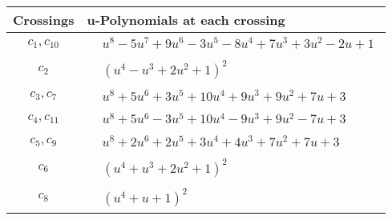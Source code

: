 \documentclass[1p]{elsarticle_modified}
\theoremstyle{definition}
\begin{document}
\begin{tabular}{m{50pt}|m{274pt}}
Crossings & \hspace{64pt}u-Polynomials at each crossing \\
\hline $$\begin{aligned}c_{1},c_{10}\end{aligned}$$&$\begin{aligned}
&u^8-5 u^7+9 u^6-3 u^5-8 u^4+7 u^3+3 u^2-2 u+1
\end{aligned}$\\
\hline $$\begin{aligned}c_{2}\end{aligned}$$&$\begin{aligned}
&(u^4- u^3+2 u^2+1)^2
\end{aligned}$\\
\hline $$\begin{aligned}c_{3},c_{7}\end{aligned}$$&$\begin{aligned}
&u^8+5 u^6+3 u^5+10 u^4+9 u^3+9 u^2+7 u+3
\end{aligned}$\\
\hline $$\begin{aligned}c_{4},c_{11}\end{aligned}$$&$\begin{aligned}
&u^8+5 u^6-3 u^5+10 u^4-9 u^3+9 u^2-7 u+3
\end{aligned}$\\
\hline $$\begin{aligned}c_{5},c_{9}\end{aligned}$$&$\begin{aligned}
&u^8+2 u^6+2 u^5+3 u^4+4 u^3+7 u^2+7 u+3
\end{aligned}$\\
\hline $$\begin{aligned}c_{6}\end{aligned}$$&$\begin{aligned}
&(u^4+u^3+2 u^2+1)^2
\end{aligned}$\\
\hline $$\begin{aligned}c_{8}\end{aligned}$$&$\begin{aligned}
&(u^4+u+1)^2
\end{aligned}$\\
\hline
\end{tabular}\\~\\
\newpage\renewcommand{\arraystretch}{1}
\end{document}
